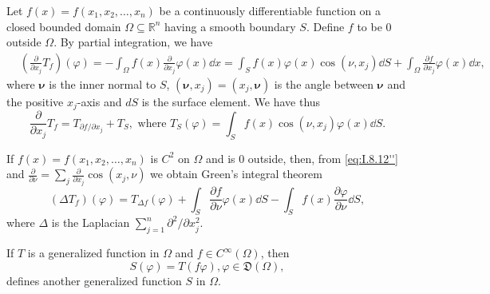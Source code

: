 \begin{example}\label{ex:I.8.Example.3a} Let $f(x) = f(x_1, x_2, \ldots, x_n)$ be a continuously differentiable function on a closed bounded domain $\Omega \subseteq \mathbb{R}^{n}$ having a smooth boundary $S$. Define $f$ to be $0$ outside $\Omega$. By partial integration, we have 
\[
\begin{aligned}
&\left(\frac {\partial}{\partial x_{j}} T_{f}\right) (\varphi)  =- \int_{\Omega} f (x) \frac {\partial}{\partial x_{j}} \varphi (x) \dd x = \int_{S} f (x) \varphi (x) \cos (\nu , x_{j}) \dd S + \int_{\Omega} \frac {\partial f}{\partial x_{j}} \varphi (x) \dd x,
\end{aligned}
\]
where $\pmb{\nu}$ is the inner normal to $S$, $(\pmb{\nu}, x_j) = (x_j, \pmb{\nu})$ is the angle between $\pmb{\nu}$ and the positive $x_j$-axis and $dS$ is the surface element. We have thus 
\begin{equation}\tag{12''}\label{eq:I.8.12''}
\frac {\partial}{\partial x_{j}} T_{f} = T_ {\partial f / \partial x_{j}} + T_{S}, \text{ where } T_{S} (\varphi) = \int_{S} f (x) \cos (\nu , x_{j}) \varphi (x) \dd S.
\end{equation}
\end{example}

\begin{corollaryu} If $f(x) = f(x_1, x_2, \ldots, x_n)$ is $C^2$ on $\Omega$ and is $0$ outside, then, from \eqref{eq:I.8.12''} and $\frac{\partial}{\partial \nu} = \sum\limits_j \frac{\partial}{\partial x_j} \cos (x_j, \nu)$ we obtain Green's 
integral theorem 
\begin{equation}\tag{12'''}\label{eq:I.8.12''a}
\left(\Delta T_{f}\right) (\varphi) = T_{\Delta f} (\varphi) + \int_{S} \frac {\partial f}{\partial \nu} \varphi (x) \dd S- \int_{S} f (x) \frac {\partial \varphi}{\partial \nu} \dd S,
\end{equation}
where $\Delta$ is the Laplacian $\sum\limits_{j=1}^{n} \partial^2 / \partial x_j^2$. 
\end{corollaryu}

\begin{proposition}\label{prop:I.8.Proposition.3} If $T$ is a generalized function in $\Omega$ and $f \in C^{\infty}(\Omega)$, then 
\begin{equation}\label{eq:I.8.13}
S (\varphi) = T (f \varphi), \varphi \in \mathfrak {D} (\Omega),
\end{equation}
defines another generalized function $S$ in $\Omega$. 
\end{proposition}

